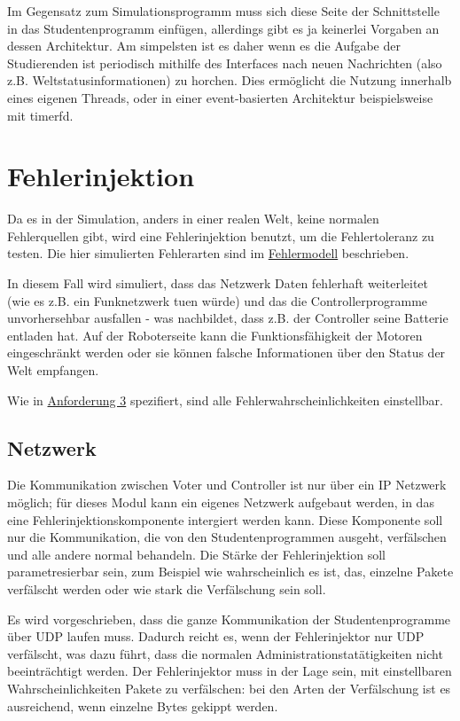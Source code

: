 Im Gegensatz zum Simulationsprogramm muss sich diese Seite der Schnittstelle in das Studentenprogramm einf{\"{u}}gen, allerdings
gibt es ja keinerlei Vorgaben an dessen Architektur. Am simpelsten ist es daher wenn es die Aufgabe der Studierenden ist periodisch
mithilfe des Interfaces nach neuen Nachrichten (also z.B. Weltstatusinformationen) zu horchen. Dies erm{\"{o}}glicht die Nutzung
innerhalb eines eigenen Threads, oder in einer event-basierten Architektur beispielsweise mit timerfd.

\clearpage
\section{Fehlerinjektion}
Da es in der Simulation, anders in einer realen Welt, keine normalen Fehlerquellen gibt, wird eine
Fehlerinjektion benutzt, um die Fehlertoleranz zu testen. Die hier simulierten Fehlerarten 
sind im \hyperref[fm]{Fehlermodell} beschrieben.

In diesem Fall wird simuliert, dass das Netzwerk Daten fehlerhaft weiterleitet
(wie es z.B. ein Funknetzwerk tuen w{\"{u}}rde) und das die Controllerprogramme unvorhersehbar
ausfallen - was nachbildet, dass z.B. der Controller seine Batterie entladen hat. Auf der Roboterseite
kann die Funktionsf{\"{a}}higkeit der Motoren eingeschr{\"{a}}nkt werden oder sie k{\"{o}}nnen
falsche Informationen {\"{u}}ber den Status der Welt empfangen.

Wie in \hyperref[anforderung]{Anforderung 3} spezifiert, sind alle Fehlerwahrscheinlichkeiten einstellbar.

\subsection{Netzwerk}
Die Kommunikation zwischen Voter und Controller ist nur {\"{u}}ber ein IP Netzwerk m{\"{o}}glich;
f{\"{u}}r dieses Modul kann ein eigenes Netzwerk aufgebaut werden, in das eine Fehlerinjektionskomponente 
intergiert werden kann. Diese Komponente soll nur die Kommunikation, die von den Studentenprogrammen ausgeht, 
verf{\"{a}}lschen und alle andere normal behandeln. Die St{\"{a}}rke der Fehlerinjektion soll parametresierbar 
sein, zum Beispiel wie wahrscheinlich es ist, das, einzelne Pakete verf{\"{a}}lscht werden oder wie stark
die Verf{\"{a}}lschung sein soll.

Es wird vorgeschrieben, dass die ganze Kommunikation der Studentenprogramme {\"{u}}ber UDP laufen muss. Dadurch reicht es, wenn der Fehlerinjektor nur UDP verf{\"{a}}lscht, was dazu
f{\"{u}}hrt, dass die normalen Administrationstat{\"{a}}tigkeiten nicht beeintr{\"{a}}chtigt werden. Der Fehlerinjektor muss in der Lage sein, mit einstellbaren Wahrscheinlichkeiten
Pakete zu verf{\"{a}}lschen: bei den Arten der Verf{\"{a}}lschung ist es ausreichend, wenn einzelne Bytes gekippt werden.

